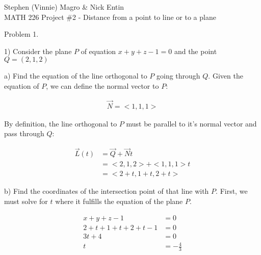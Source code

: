 \documentclass{article}
\begin{document}
\begin{text}
Stephen (Vinnie) Magro \& Nick Entin \\
\indent MATH 226 Project \#2 - Distance from a point to line or to a plane \\
\newline
\newline
\end{text}
\begin{text}
Problem 1. \\
\end{text}

\begin{text}
1) Consider the plane $P$ of equation $x + y + z - 1 = 0$ and the point $Q = (2, 1, 2)$
\newline
\end{text}

\begin{text}
\indent a) Find the equation of the line orthogonal to $P$ going through $Q$.
\newline\newline
\indent\indent\indent Given the equation of $P$, we can define the normal vector to $P$:
\end{text}

\begin{align*}
\vec{N}=<1,1,1>
\end{align*}

\begin{text}
\indent\indent By definition, the line orthogonal to $P$ must be parallel to it's normal vector and pass through $Q$:
\end{text}

\begin{align*}
\vec{L}(t) &= \vec{Q} + \vec{N}t \\
           &= < 2, 1, 2 > + < 1, 1, 1 >t \\
           &= < 2 + t, 1 + t, 2 + t >
\end{align*}

\begin{text}
\indent b) Find the coordinates of the intersection point of that line with $P$.
\newline\newline
\indent\indent\indent First, we must solve for $t$ where it fulfills the equation of the plane $P$.
\end{text}

\begin{align*}
x + y + z - 1 &= 0 \\
2 + t + 1 + t + 2 + t -1 &= 0 \\
3t + 4 &= 0 \\
t &= -\frac{4}{3}
\end {align*}
\end{document}
